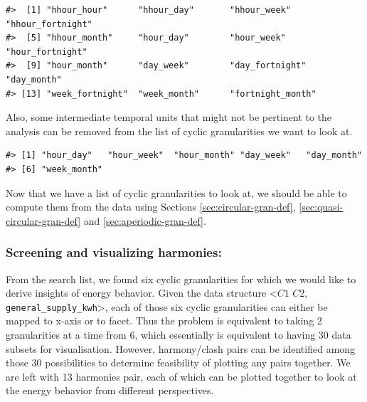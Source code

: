 \documentclass[12pt]{article}
\newenvironment{Shaded}{\begin{snugshade}}{\end{snugshade}}
\newcommand{\DataTypeTok}[1]{\textcolor[rgb]{0.13,0.29,0.53}{#1}}
\newcommand{\KeywordTok}[1]{\textcolor[rgb]{0.13,0.29,0.53}{\textbf{#1}}}
\newcommand{\NormalTok}[1]{#1}
\newcommand{\OperatorTok}[1]{\textcolor[rgb]{0.81,0.36,0.00}{\textbf{#1}}}
\newcommand{\StringTok}[1]{\textcolor[rgb]{0.31,0.60,0.02}{#1}}
\begin{document}
\begin{verbatim}
#>  [1] "hhour_hour"      "hhour_day"       "hhour_week"      "hhour_fortnight"
#>  [5] "hhour_month"     "hour_day"        "hour_week"       "hour_fortnight" 
#>  [9] "hour_month"      "day_week"        "day_fortnight"   "day_month"      
#> [13] "week_fortnight"  "week_month"      "fortnight_month"
\end{verbatim}

Also, some intermediate temporal units that might not be pertinent to the analysis can be removed from the list of cyclic granularities we want to look at.

\begin{Shaded}
\end{Shaded}

\begin{verbatim}
#> [1] "hour_day"   "hour_week"  "hour_month" "day_week"   "day_month" 
#> [6] "week_month"
\end{verbatim}

Now that we have a list of cyclic granularities to look at, we should be able to compute them from the data using Sections \ref{sec:circular-gran-def}, \ref{sec:quasi-circular-gran-def} and \ref{sec:aperiodic-gran-def}.

\hypertarget{screening-and-visualizing-harmonies}{%
\subsubsection{Screening and visualizing harmonies:}\label{screening-and-visualizing-harmonies}}

From the search list, we found six cyclic granularities for which we would like to derive insights of energy behavior. Given the data structure \textless{}\(C1\) \(C2\), \texttt{general\_supply\_kwh}\textgreater, each of those six cyclic granularities can either be mapped to x-axis or to facet. Thus the problem is equivalent to taking 2 granularities at a time from 6, which essentially is equivalent to having 30 data subsets for visualisation. However, harmony/clash pairs can be identified among those 30 possibilities to determine feasibility of plotting any pairs together. We are left with 13 harmonies pair, each of which can be plotted together to look at the energy behavior from different perspectives.
\end{document}
